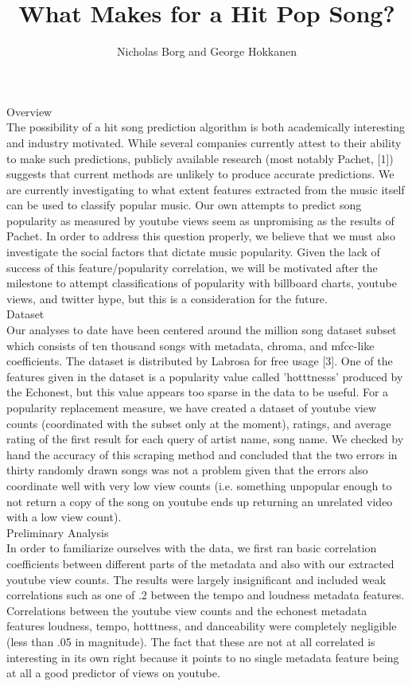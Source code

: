 \documentclass[11pt]{amsart}
\title{What Makes for a Hit Pop Song?}
\author{Nicholas Borg and George Hokkanen}
\begin{document}
\maketitle
{\huge Overview \huge} \\
The possibility of a hit song prediction algorithm is both academically interesting and industry motivated. While several companies currently attest to their ability to make such predictions, publicly available research (most notably Pachet, [1]) suggests that current methods are unlikely to produce accurate predictions. We are currently investigating to what extent features extracted from the music itself can be used to classify popular music. Our own attempts to predict song popularity as measured by youtube views seem as unpromising as the results of Pachet. In order to address this question properly, we believe that we must also investigate the social factors that dictate music popularity. Given the lack of success of this feature/popularity correlation, we will be motivated after the milestone to attempt classifications of popularity with billboard charts, youtube views, and twitter hype, but this is a consideration for the future. \\

{\huge Dataset \huge} \\
Our analyses to date have been centered around the million song dataset subset which consists of ten thousand songs with metadata, chroma, and mfcc-like coefficients. The dataset is distributed by Labrosa for free usage [3]. One of the features given in the dataset is a popularity value called 'hotttnesss' produced by the Echonest, but this value appears too sparse in the data to be useful. For a popularity replacement measure, we have created a dataset of youtube view counts (coordinated with the subset only at the moment), ratings, and average rating of the first result for each query of artist name, song name. We checked by hand the accuracy of this scraping method and concluded that the two errors in thirty randomly drawn songs was not a problem given that the errors also coordinate well with very low view counts (i.e. something unpopular enough to not return a copy of the song on youtube ends up returning an unrelated video with a low view count). \\

{\huge Preliminary Analysis \huge} \\

In order to familiarize ourselves with the data, we first ran basic correlation coefficients between different parts of the metadata and also with our extracted youtube view counts. The results were largely insignificant and included weak correlations such as one of .2 between the tempo and loudness metadata features. Correlations between the youtube view counts and the echonest metadata features loudness, tempo, hotttness, and danceability were completely negligible (less than .05 in magnitude). The fact that these are not at all correlated is interesting in its own right because it points to no single metadata feature being at all a good predictor of views on youtube. \\
\end{document}
